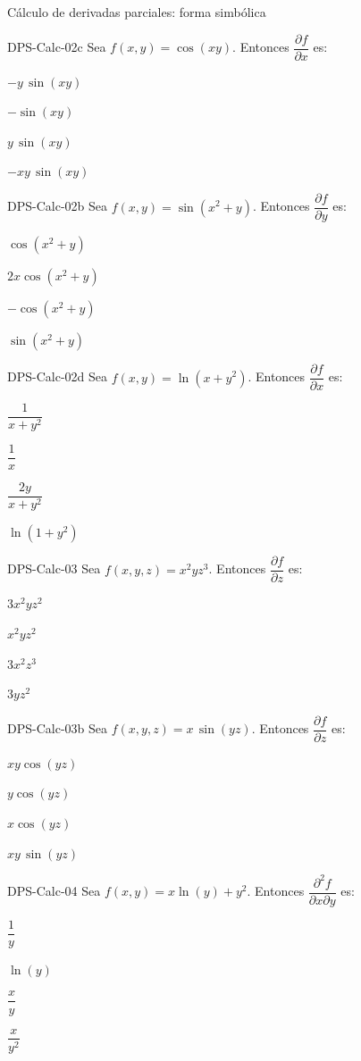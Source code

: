 \documentclass[a4,11pt]{aleph-notas}
\begin{document}
\begin{quiz}{Cálculo de derivadas parciales: forma simbólica}
\begin{multi}[]%
    {DPS-Calc-02c}
    Sea $f(x,y) = \cos(xy)$. Entonces $\dfrac{\partial f}{\partial x}$ es:
    \item* $-y\,\sin(xy)$
    \item $-\sin(xy)$
    \item $y\,\sin(xy)$
    \item $-xy\,\sin(xy)$
\end{multi}

\begin{multi}[]%
    {DPS-Calc-02b}
    Sea $f(x,y) = \sin(x^2 + y)$. Entonces $\dfrac{\partial f}{\partial y}$ es:
    \item* $\cos(x^2 + y)$
    \item $2x\cos(x^2+y)$
    \item $-\cos(x^2+y)$
    \item $\sin(x^2+y)$
\end{multi}

\begin{multi}[]%
    {DPS-Calc-02d}
    Sea $f(x,y) = \ln(x + y^2)$. Entonces $\dfrac{\partial f}{\partial x}$ es:
    \item* $\dfrac{1}{x+y^2}$
    \item $\dfrac{1}{x}$
    \item $\dfrac{2y}{x+y^2}$
    \item $\ln(1+y^2)$
\end{multi}

\begin{multi}[]%
    {DPS-Calc-03}
    Sea $f(x,y,z) = x^2 y z^3$. Entonces $\dfrac{\partial f}{\partial z}$ es:
    \item* $3x^2 y z^2$
    \item $x^2 y z^2$
    \item $3x^2 z^3$
    \item $3y z^2$
\end{multi}

\begin{multi}[]%
    {DPS-Calc-03b}
    Sea $f(x,y,z) = x\,\sin(yz)$. Entonces $\dfrac{\partial f}{\partial z}$ es:
    \item* $xy\cos(yz)$
    \item $y\cos(yz)$
    \item $x\cos(yz)$
    \item $xy\,\sin(yz)$
\end{multi}

\begin{multi}[]%
    {DPS-Calc-04}
    Sea $f(x,y) = x\ln(y) + y^2$. Entonces $\dfrac{\partial^2 f}{\partial x \partial y}$ es:
    \item* $\dfrac{1}{y}$
    \item $\ln(y)$
    \item $\dfrac{x}{y}$
    \item $\dfrac{x}{y^2}$
\end{multi}


\end{quiz}
\end{document}
